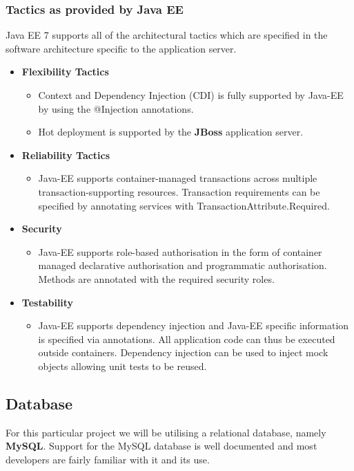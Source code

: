 \documentclass[a4paper,12pt]{article}
\begin{document}
	\subsubsection{Tactics as provided by Java EE}
	Java EE 7 supports all of the architectural tactics which are specified in the software architecture specific to the application server.
	
	\begin{itemize}
		\item\textbf{Flexibility Tactics}
		\begin{itemize}
			\item Context and Dependency Injection (CDI) is fully supported by Java-EE by using the @Injection annotations.
			\item Hot deployment is supported by the \textbf{JBoss} application server.
		\end{itemize}
		
		\item\textbf{Reliability Tactics}
		\begin{itemize}
			\item Java-EE supports container-managed transactions across multiple transaction-supporting resources. Transaction requirements can be specified by annotating services with TransactionAttribute.Required.
		\end{itemize}
		
		\item\textbf{Security}
		\begin{itemize}
			\item Java-EE supports role-based authorisation in the form of container managed declarative authorisation and programmatic authorisation. Methods are annotated with the required security roles.
		\end{itemize}
		
		\item\textbf{Testability}
		\begin{itemize}
			\item Java-EE supports dependency injection and Java-EE specific information is specified via annotations. All application code can thus be executed outside containers. Dependency injection can be used to inject mock objects allowing unit tests to be reused.
		\end{itemize}
		
	\end{itemize}
	\subsection{Database}
	For this particular project we will be utilising a relational database, namely \textbf{MySQL}. Support for the MySQL database is well documented and most developers are fairly familiar with it and its use. 
	
\end{document}
